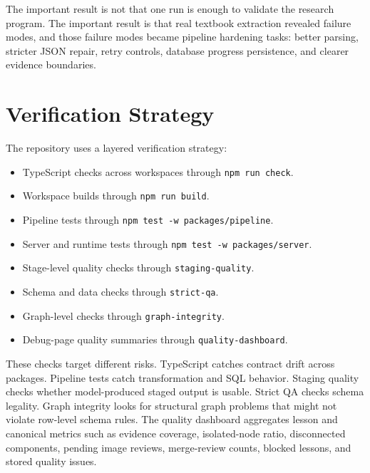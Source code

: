 \documentclass[11pt,letterpaper]{article}
\newcommand{\code}[1]{\nolinkurl{#1}}
\begin{document}
The important result is not that one run is enough to validate the research program. The important result is that real textbook extraction revealed failure modes, and those failure modes became pipeline hardening tasks: better parsing, stricter JSON repair, retry controls, database progress persistence, and clearer evidence boundaries.

\section{Verification Strategy}

The repository uses a layered verification strategy:

\begin{itemize}
  \item TypeScript checks across workspaces through \code{npm run check}.
  \item Workspace builds through \code{npm run build}.
  \item Pipeline tests through \code{npm test -w packages/pipeline}.
  \item Server and runtime tests through \code{npm test -w packages/server}.
  \item Stage-level quality checks through \code{staging-quality}.
  \item Schema and data checks through \code{strict-qa}.
  \item Graph-level checks through \code{graph-integrity}.
  \item Debug-page quality summaries through \code{quality-dashboard}.
\end{itemize}

These checks target different risks. TypeScript catches contract drift across packages. Pipeline tests catch transformation and SQL behavior. Staging quality checks whether model-produced staged output is usable. Strict QA checks schema legality. Graph integrity looks for structural graph problems that might not violate row-level schema rules. The quality dashboard aggregates lesson and canonical metrics such as evidence coverage, isolated-node ratio, disconnected components, pending image reviews, merge-review counts, blocked lessons, and stored quality issues.
\end{document}
